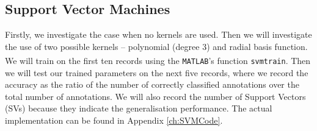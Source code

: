 \subsection{Support Vector Machines}
\label{sec:svmExperiments-ta}
	Firstly, we investigate the case when no kernels are used. Then we will investigate the use of two possible kernels -- polynomial (degree 3) and radial basis function. We will train on the first ten records using the \verb!MATLAB!\textsuperscript{\textregistered}'s function \verb!svmtrain!. Then we will test our trained parameters on the next five records, where we record the accuracy as the ratio of the number of correctly classified annotations over the total number of annotations. We will also record the number of Support Vectors (SVs) because they indicate the generalisation performance. The actual implementation can be found in Appendix \ref{ch:SVMCode}.

